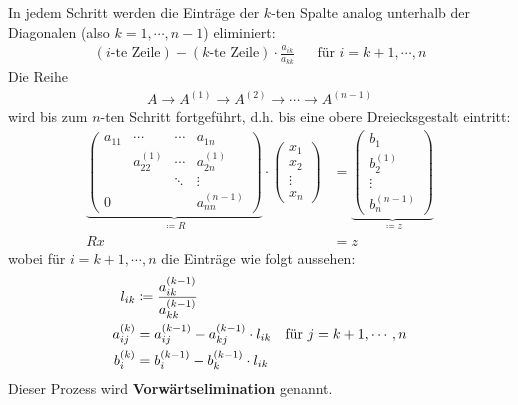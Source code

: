 \documentclass[ngerman,fontsize=11pt, paper=a4, parskip=half, titlepage=true, toc=bib]{scrbook}
\begin{document}
In jedem Schritt werden die Einträge der $k$-ten Spalte analog 
unterhalb der Diagonalen (also $k=1, \cdots, n-1$) eliminiert:
\begin{align*}
  (\text{$i$-te Zeile})- (\text{$k$-te Zeile})\cdot\frac{a_{ik}}{a_{kk}}
  && \text{für } i=k+1, \cdots ,n 
\end{align*}
Die Reihe 
\begin{gather*}
  A \rightarrow A^{(1)} \rightarrow A^{(2)} \rightarrow \dotsm \rightarrow A^{(n-1)}
\end{gather*}
wird bis zum $n$-ten Schritt fortgeführt, d.h. bis eine obere Dreiecksgestalt eintritt:
\begin{align}
  \nonumber
  \underbrace{	\begin{pmatrix}
      a_{11} & \dotsm & \dotsm & a_{1n} \\
      & a_{22}^{(1)} & \dotsm & a_{2n}^{(1)} \\
      &&              \ddots  &  \vdots \\
      0        && &                             a_{nn}^{(n-1)}
    \end{pmatrix}}_{\coloneqq R}
                    \cdot
                    \begin{pmatrix}
                      x_1 \\
                      x_2 \\
                      \vdots \\
                      x_n
                    \end{pmatrix}
             & =
               \underbrace{\begin{pmatrix}
                   b_1 \\
                   b_2^{(1)} \\
                   \vdots \\
                   b_n^{(n-1)}
                 \end{pmatrix}}_{\coloneqq z} \\
  Rx &= z 	\label{II.1.1} 
\end{align}
wobei für  $i=k+1, \cdots ,n$ die Einträge wie folgt aussehen:
\begin{align}	
  l_{ik} &\coloneqq \frac{a_{ik}^{(k-1)}}{a_{kk}^{(k-1)}} \label{II.1.2} \\
  a_{ij}^{(k)} &= a_{ij}^{(k-1)} - a_{kj}^{(k-1)}\cdot l_{ik} \label{II.1.3}
               & \text{für } j=k+1, \cdots , n\\ %
  b_i^{(k)} &= b_i^{(k-1)} -b_k^{(k-1)} \cdot   l_{ik}
  \label{II.1.4}\index{Vorwärtssubstitution}
\end{align}
Dieser Prozess wird \textbf{Vorwärtselimination} genannt.\\
\end{document}
